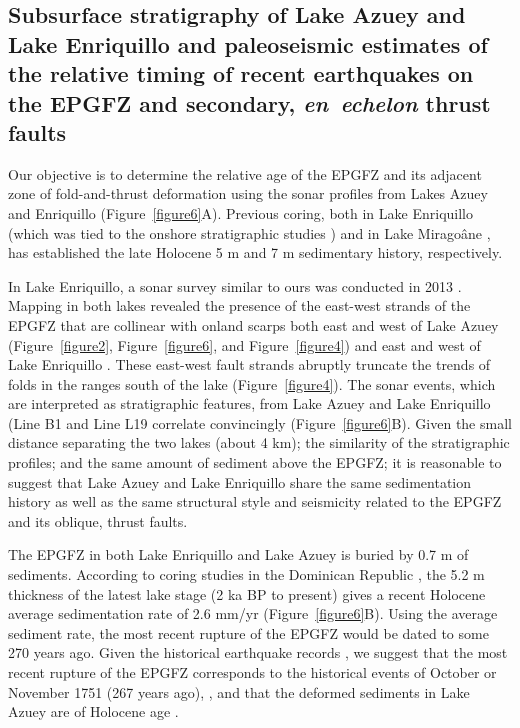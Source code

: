 \documentclass[linenumbers,draft]{agujournal}
\begin{document}
\subsection{Subsurface stratigraphy of Lake Azuey and Lake Enriquillo and paleoseismic estimates of the relative timing of recent earthquakes on the EPGFZ and secondary, \textit{en~echelon} thrust faults}
Our objective is to determine the relative age of the EPGFZ and its adjacent zone of fold-and-thrust deformation using the sonar profiles from Lakes Azuey and Enriquillo (Figure~\ref{figure6}A). Previous coring, both in Lake Enriquillo \citep{rios2013holocene} (which was tied to the onshore stratigraphic studies \citep{taylor1985stratigraphy,rios2013holocene}) and in Lake Mirago\^ane \citep{higuera199910}, has established the late Holocene 5 m and 7 m sedimentary history, respectively.

In Lake Enriquillo, a sonar survey similar to ours was conducted in 2013 \citep{rios2013holocene}. Mapping in both lakes revealed the presence of the east-west strands of the EPGFZ that are collinear with onland scarps both east and west of Lake Azuey (Figure~\ref{figure2}, Figure~\ref{figure6}, and Figure~\ref{figure4}) and east and west of Lake Enriquillo \citep{mann1995actively,rios2013holocene}. These east-west fault strands abruptly truncate the trends of folds in the ranges south of the lake (Figure~\ref{figure4}). The sonar events, which are interpreted as stratigraphic features, from Lake Azuey and Lake Enriquillo (Line B1 and Line L19 correlate convincingly (Figure~\ref{figure6}B). Given the small distance separating the two lakes (about 4 km); the similarity of the stratigraphic profiles; and the same amount of sediment above the EPGFZ; it is reasonable to suggest that Lake Azuey and Lake Enriquillo share the same sedimentation history as well as the same structural style and seismicity related to the EPGFZ and its oblique, thrust faults.

The EPGFZ in both Lake Enriquillo and Lake Azuey is buried by 0.7 m of sediments. According to coring studies in the Dominican Republic \citep{taylor1985stratigraphy,rios2013holocene}, the 5.2 m thickness of the latest lake stage (2 ka BP to present) gives a recent Holocene average sedimentation rate of 2.6 mm/yr (Figure~\ref{figure6}B). Using the average sediment rate, the most recent rupture of the EPGFZ would be dated to some 270 years ago. Given the historical earthquake records \citep{bakun2012significant}, we suggest that the most recent rupture of the EPGFZ corresponds to the historical events of October or November 1751 (267 years ago), , and that the deformed sediments in Lake Azuey are of Holocene age \citep{rios2013holocene}.
\end{document}
